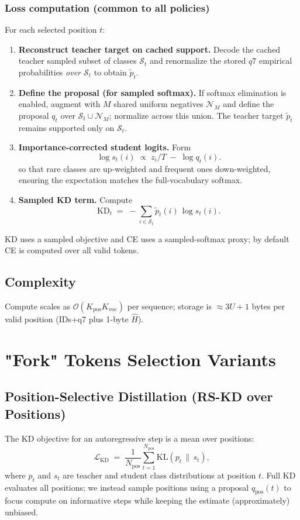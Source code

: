 \documentclass[11pt]{article}
\begin{document}
\subsubsection{Loss computation (common to all policies)}
For each selected position $t$:
\begin{enumerate}
	\item \textbf{Reconstruct teacher target on cached support.} Decode the cached teacher sampled subset of classes $\mathcal{S}_t$ and renormalize the stored $q7$ empirical probabilities \emph{over $\mathcal{S}_t$} to obtain $\tilde p_t$.
	\item \textbf{Define the proposal (for sampled softmax).} If softmax elimination is enabled, augment with $M$ shared uniform negatives $\mathcal{N}_M$ and define the proposal $q_t$ over $\mathcal{S}_t\cup\mathcal{N}_M$; normalize across this union. The teacher target $\tilde p_t$ remains supported only on $\mathcal{S}_t$.
	\item \textbf{Importance-corrected student logits.} Form
	      \[
		      \log s_t(i)\;\propto\; z_i/T \;-\; \log q_t(i).
	      \]
	      so that rare classes are up-weighted and frequent ones down-weighted,
	      ensuring the expectation matches the full-vocabulary softmax.
	\item \textbf{Sampled KD term.} Compute
	      \[
		      \mathrm{KD}_t \;=\; -\!\sum_{i\in\mathcal{S}_t} \tilde p_t(i)\,\log s_t(i).
	      \]
\end{enumerate}
KD uses a sampled objective and CE uses a sampled-softmax proxy; by default CE is computed over all valid tokens.


\subsection{Complexity}
Compute scales as $\mathcal{O}(K_{\text{pos}}K_{\text{voc}})$ per sequence; storage is $\approx 3U + 1$ bytes per valid position (IDs+q7 plus 1-byte $\hat H$).

\section{"Fork" Tokens Selection Variants}
\subsection{Position-Selective Distillation (RS-KD over Positions)}
\label{sec:posrs}

The KD objective for an autoregressive step is a mean over positions:
\[
	\mathcal{L}_{\text{KD}} \;=\; \frac{1}{N_{\text{pos}}} \sum_{t=1}^{N_{\text{pos}}}
	\mathrm{KL}\!\left(p_t \,\|\, s_t\right),
\]
where $p_t$ and $s_t$ are teacher and student class distributions at position $t$.
Full KD evaluates all positions; we instead sample positions using a proposal
$q_{\text{pos}}(t)$ to focus compute on informative steps while keeping the estimate (approximately) unbiased.
\end{document}
